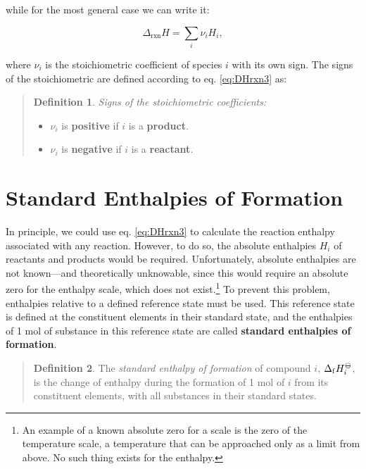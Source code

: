 \documentclass[
  9pt,
]{extbook}
\providecommand{\tightlist}{%
  \setlength{\itemsep}{0pt}\setlength{\parskip}{0pt}}
\theoremstyle{definition}
\newtheorem{definition}{Definition}[chapter]
\theoremstyle{definition}
\theoremstyle{definition}
\theoremstyle{remark}
\begin{document}
while for the most general case we can write it:

\begin{equation}
  \Delta_{\text{rxn}} H = \sum_i \nu_i H_i,
  \label{eq:DHrxn4}
\end{equation}

where \(\nu_i\) is the stoichiometric coefficient of species \(i\) with its own sign. The signs of the stoichiometric are defined according to eq. \eqref{eq:DHrxn3} as:

\begin{quote}
\begin{definition}
\protect\hypertarget{def:nui}{}{\label{def:nui} }\emph{Signs of the stoichiometric coefficients:}

\begin{itemize}
\tightlist
\item
  \(\nu_i\) is \textbf{positive} if \(i\) is a \textbf{product}.
\item
  \(\nu_i\) is \textbf{negative} if \(i\) is a \textbf{reactant}.
\end{itemize}
\end{definition}
\end{quote}

\hypertarget{formenthalpy}{%
\section{Standard Enthalpies of Formation}\label{formenthalpy}}

In principle, we could use eq. \eqref{eq:DHrxn3} to calculate the reaction enthalpy associated with any reaction. However, to do so, the absolute enthalpies \(H_i\) of reactants and products would be required. Unfortunately, absolute enthalpies are not known---and theoretically unknowable, since this would require an absolute zero for the enthalpy scale, which does not exist.\footnote{An example of a known absolute zero for a scale is the zero of the temperature scale, a temperature that can be approached only as a limit from above. No such thing exists for the enthalpy.} To prevent this problem, enthalpies relative to a deﬁned reference state must be used. This reference state is defined at the constituent elements in their standard state, and the enthalpies of 1 mol of substance in this reference state are called \textbf{standard enthalpies of formation}.

\begin{quote}
\begin{definition}
\protect\hypertarget{def:stdenthapies}{}{\label{def:stdenthapies} }
The \emph{standard enthalpy of formation} of compound \(i\), \(\Delta_{\mathrm{f}} H_i^{-\kern-6pt{\ominus}\kern-6pt-}\), is the change of enthalpy during the formation of 1 mol of \(i\) from its constituent elements, with all substances in their standard states.
\end{definition}
\end{quote}
\end{document}
